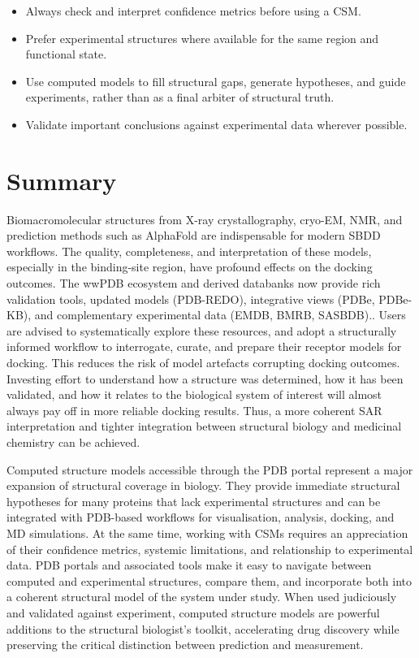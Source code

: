 \documentclass[12pt]{article}
\begin{document}
\begin{itemize}
  \item Always check and interpret confidence metrics before using a CSM.
  \item Prefer experimental structures where available for the same region and functional state.
  \item Use computed models to fill structural gaps, generate hypotheses, and guide experiments, rather than as a final arbiter of structural truth.
  \item Validate important conclusions against experimental data wherever possible.
\end{itemize}

\section{Summary}

Biomacromolecular structures from X-ray crystallography, cryo-EM, NMR, and prediction methods such as AlphaFold are indispensable for modern SBDD workflows. The quality, completeness, and interpretation of these models, especially in the binding-site region, have profound effects on the docking outcomes. The wwPDB ecosystem and derived databanks now provide rich validation tools, updated models (PDB-REDO), integrative views (PDBe, PDBe-KB), and complementary experimental data (EMDB, BMRB, SASBDB).\cite{CH4_wwpdb2019protein,CH4_Velankar2016_PDBe,CH4_young2018worldwide,CH4_Valentini2015_SASBDB}. Users are advised to systematically explore these resources, and adopt a structurally informed workflow to interrogate, curate, and prepare their receptor models for docking. This reduces the risk of model artefacts corrupting docking outcomes. Investing effort to understand how a structure was determined, how it has been validated, and how it relates to the biological system of interest will almost always pay off in more reliable docking results. Thus, a more coherent SAR interpretation and tighter integration between structural biology and medicinal chemistry can be achieved. 

Computed structure models accessible through the PDB portal represent a major expansion of structural coverage in biology. They provide immediate structural hypotheses for many proteins that lack experimental structures and can be integrated with PDB-based workflows for visualisation, analysis, docking, and MD simulations\cite{CH4_wwpdb2019protein,CH4_Burley2022,CH4_Varadi2022_AlphaFoldDB}. At the same time, working with CSMs requires an appreciation of their confidence metrics, systemic limitations, and relationship to experimental data. PDB portals and associated tools make it easy to navigate between computed and experimental structures, compare them, and incorporate both into a coherent structural model of the system under study. When used judiciously and validated against experiment, computed structure models are powerful additions to the structural biologist's toolkit, accelerating drug discovery while preserving the critical distinction between prediction and measurement.




\end{document}
